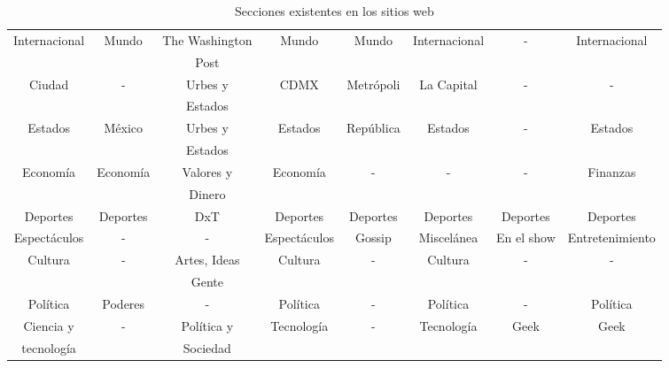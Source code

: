 \begin{table}[H]
{\begin{tabular}[H]{|c|c|c|c|c|c|c|c|}
        Internacional & Mundo & The Washington & Mundo & Mundo & Internacional & - & Internacional\\
         & & Post & & & & &\\
        \hline

        Ciudad & - & Urbes y & CDMX & Metrópoli & La Capital& - & -\\ 
         &  & Estados & & & & & \\
        \hline

        Estados & México & Urbes y & Estados & República & Estados & - & Estados\\ 
         &  & Estados & & & & & \\
        \hline

        Economía & Economía & Valores y & Economía & - & - & - & Finanzas\\ 
         &  & Dinero & & & & & \\
        \hline

        Deportes & Deportes & DxT & Deportes & Deportes & Deportes & Deportes & Deportes\\ 
        \hline

        Espectáculos & - & - & Espectáculos & Gossip & Miscelánea &  En el show & Entretenimiento\\ 
        \hline

        Cultura & - & Artes, Ideas & Cultura & - & Cultura & - & -\\ 
         &  & Gente & & & & &\\ 
        \hline

        Política & Poderes & - & Política & - & Política & - & Política\\ 
        \hline

        Ciencia y & - & Política y & Tecnología & - & Tecnología  & Geek & Geek\\ 
        tecnología &  & Sociedad & & & & &  \\ 
        \hline        

    \end{tabular}%
}
\caption[Secciones de los sitios web]{Secciones existentes en los sitios web}
\label{tabla:sitios}
\end{table}

